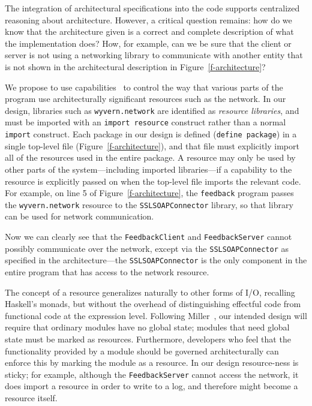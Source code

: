 \documentclass[runningheads]{llncs}
\begin{document}
\begin{sloppypar}
The integration of architectural specifications into the code supports centralized reasoning about architecture.  However, a critical question remains: how do we know that the architecture given is a correct and complete description of what the implementation does?  How, for example, can we be sure that the client or server is not using a networking library to communicate with another entity that is not shown in the architectural description in Figure~\ref{f-architecture}?

We propose to use capabilities~\cite{Wulf:1974:HKM:355616.364017} to control the way that various parts of the program use architecturally significant resources such as the network.  In our design, libraries such as \texttt{wyvern.network} are identified as \emph{resource libraries}, and must be imported with an \texttt{import resource} construct rather than a normal \texttt{import} construct.  Each package in our design is defined (\texttt{define package}) in a single top-level file (Figure~\ref{f-architecture}), and that file must explicitly import all of the resources used in the entire package.  A resource may only be used by other parts of the system---including imported libraries---if a capability to the resource is explicitly passed on when the top-level file imports the relevant code.  For example, on line 5 of Figure~\ref{f-architecture}, the \texttt{feedback} program passes the \texttt{wyvern.network} resource to the \texttt{SSLSOAPConnector} library, so that library can be used for network communication.

Now we can clearly see that the \texttt{FeedbackClient} and \texttt{FeedbackServer} cannot possibly communicate over the network, except via the \texttt{SSLSOAPConnector} as specified in the architecture---the \texttt{SSLSOAPConnector} is the only component in the entire program that has access to the network resource.

The concept of a resource generalizes naturally to other forms of I/O, recalling Haskell's monads, but without the overhead of distinguishing effectful code from functional code at the expression level.  Following Miller~\cite{MarkMiller-E}, our intended design will require that ordinary modules have no global state; modules that need global state must be marked as resources.  Furthermore, developers who feel that the functionality provided by a module should be governed architecturally can enforce this by marking the module as a resource.  In our design resource-ness is sticky; for example, although the \texttt{FeedbackServer} cannot access the network, it does import a resource in order to write to a log, and therefore might become a resource itself.


\end{sloppypar}
\end{document}
